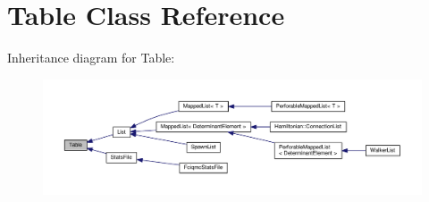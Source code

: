 \hypertarget{classTable}{}\section{Table Class Reference}
\label{classTable}


Inheritance diagram for Table\+:\nopagebreak
\begin{figure}[H]
\begin{center}
\leavevmode
\includegraphics[width=350pt]{classTable__inherit__graph}
\end{center}
\end{figure}
